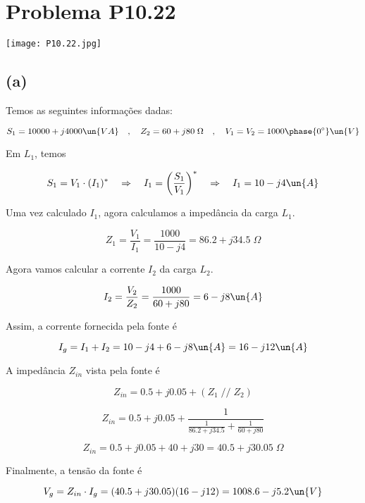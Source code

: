 
\section*{Problema P10.22}

\renewcommand*\thesection{10.22}

\begin{center}
    \texttt{[image: P10.22.jpg]}
\end{center}

\subsection*{(a)}

Temos as seguintes informações dadas:

\[ S_1 = 10000 + j4000 \un{VA} \quad , \quad Z_2 = 60 + j80 \;\Omega \quad , \quad V_1 = V_2 = 1000\phase{0^{\circ}} \un{V} \]

Em $L_1$, temos    

\[ S_1 = V_1 \cdot (I_1)^* \quad \Rightarrow \quad I_1 = \left(\frac{S_1}{V_1}\right)^* \quad \Rightarrow \quad I_1 = 10 -j4 \un{A}\]

Uma vez calculado $I_1$, agora calculamos a impedância da carga $L_1$.

\[ Z_1 = \frac{V_1}{I_1} = \frac{1000}{10 - j4} = 86.2 + j34.5 \;\Omega \]

Agora vamos calcular a corrente $I_2$ da carga $L_2$.

\[ I_2 = \frac{V_2}{Z_2} = \frac{1000}{60 + j80} = 6 - j8 \un{A}  \]



Assim, a corrente fornecida pela fonte é

\[ I_g = I_1 + I_2 = 10 -j4 +  6 - j8 \un{A} = 16 - j12 \un{A} \]

A impedância $Z_{in}$ vista pela fonte é

\[ Z_{in} = 0.5 + j0.05 + (Z_1 \; // \; Z_2) \]

\[ Z_{in} = 0.5 + j0.05 + \frac{1}{\frac{1}{86.2 + j34.5} + \frac{1}{60 + j80}} \]

\[ Z_{in} = 0.5 + j0.05 + 40 + j30 = 40.5 + j30.05 \;\Omega \]

Finalmente, a tensão da fonte é

\[ V_g = Z_{in} \cdot I_g = (40.5 + j30.05)(16 - j12) = 1008.6 - j5.2 \un{V}\]

